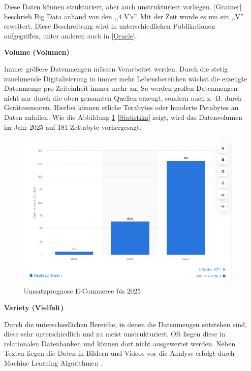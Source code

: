Diese Daten können strukturiert, aber auch unstrukturiert vorliegen. [Gratner] beschrieb Big Data anhand von den ,,4 V's''. Mit der Zeit wurde es um ein ,,V'' erweitert. Diese Beschreibung wird in unterschiedlichen Publikationen aufgegriffen, unter anderen auch in [\href{https://www.oracle.com/de/big-data/what-is-big-data}{Oracle}].\vspace{0.5cm}

\textbf{Volume (Volumen)}\vspace{0.2cm}

Immer größere Datenmengen müssen Verarbeitet werden. Durch die stetig zunehmende Digitalisierung in immer mehr Lebensbereichen wächst die erzeugte Datenmenge pro Zeiteinheit immer mehr an. So werden großen Datenmengen nicht nur durch die oben genannten Quellen erzeugt, sondern auch z. B. durch Gerätesensoren. Hierbei können etliche Terabytes oder hunderte Petabytes an Daten anfallen. Wie die Abbildung \ref{img:stat_prognose_2022} [\href{https://de.statista.com/statistik/daten/studie/267974/umfrage/prognose-zum-weltweit-generierten-datenvolumen}{Statistika}] zeigt, wird das Datenvolumen im Jahr 2025 auf 181 Zettabyte vorhergesagt.\vspace{0.2cm}

\begin{figure}[!ht]
	\centering
	\includegraphics[width=\linewidth]{images/chapter2/umsatzprognose_2025.eps}
	\caption{Umsatzprognose E-Commerce bis 2025}
	\label{img:stat_prognose_2022}
\end{figure}


\textbf{Variety (Vielfalt)}\vspace{0.2cm}

Durch die unterschiedlichen Bereiche, in denen die Datenmengen entstehen sind, diese sehr unterschiedlich und zu meist unstrukturiert. Oft liegen diese in relationalen Datenbanken und können dort nicht ausgewertet werden. Neben Texten liegen die Daten in Bildern und Videos vor die Analyse erfolgt durch Machine Learning Algorithmen .\vspace{0.5cm}

